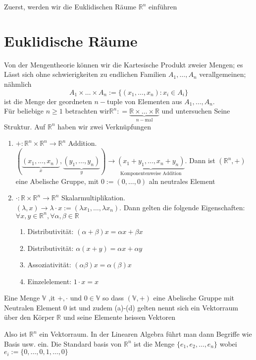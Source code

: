 \noindent Zuerst, werden wir die Euklidischen Räume $\mathbb{R}^n$ einführen
\section{Euklidische Räume}
Von der Mengentheorie können wir die Kartesische Produkt zweier Mengen; es Lässt sich ohne schwierigkeiten zu endlichen Familien $A_1,\dots ,A_n$ verallgemeinen; nähmlich \[A_1\times\dots\times A_n:=\{\left(x_1,\dots ,x_n\right):x_i\in A_i \}\] ist die Menge der geordneten $n-$tuple von Elementen aus $A_1,\dots ,A_n$.\\

Für beliebige $n\geq 1$ betrachten wir$ \mathbb{R}^n: = \underbrace {\mathbb{R} \times  \ldots  \times \mathbb{R} }_{n - {\text{mal}}}$ und untersuchen Seine Struktur. Auf $\mathbb{R}^n$ haben wir zwei Verknüpfungen
\begin{enumerate}
    \item $+:\mathbb{R}^n\times\mathbb{R}^n\to\mathbb{R}^n$ Addition.\\
$\left( {\underbrace {\left( {{x_1}, \ldots ,{x_n}} \right)}_x,\underbrace {\left( {{y_1}, \ldots ,{y_n}} \right)}_y} \right) \to \underbrace {\left( {{x_1} + {y_1}, \ldots ,{x_n} + {y_n}} \right)}_{{\text{Komponentenweise Addition}}}$. Dann ist $\left( \mathbb{R}^n,+\right)$ eine Abelische Gruppe, mit $0:=(0,\dots,0)$ aln neutrales Element
\item $\cdot:\mathbb{R}\times\mathbb{R}^n\to\mathbb{R}^n$ Skalarmultiplikation.\\
$(\lambda,x)\to\lambda\cdot x:=(\lambda x_1,\dots,\lambda x_n)$. Dann gelten die folgende Eigenschaften: $\forall x,y\in\mathbb{R}^n,\forall \alpha,\beta\in\mathbb{R}$ 
\begin{enumerate}
\item Distributivität: $\left( \alpha+\beta\right) x=\alpha x+\beta x$
\item Distributivität: $\alpha\left(x+y\right) = \alpha x+\alpha y$
\item Assoziativität: $\left( \alpha\beta\right) x=\alpha\left( \beta\right) x$
\item Einzelelement: $1\cdot x=x$
\end{enumerate}
\end{enumerate}
 
\begin{definition}{2.15}
Eine Menge $\mathbb{V}$ ,it $+,\cdot$ und $0\in\mathbb{V}$ so dass $\left(\mathbb{V},+\right)$ eine Abelische Gruppe mit Neutralen Element 0 ist und zudem (a)-(d) gelten nennt sich ein Vektorraum über den Körper $\mathbb{R}$ und seine Elemente heissen Vektoren
\end{definition}
Also ist $\mathbb{R}^n$ ein Vektorraum. In der Linearen Algebra führt man dann Begriffe wie Basis usw. ein. Die Standard basis von $\mathbb{R}^n$ ist die Menge $\{e_1,e_2,\dots,e_n \}$ wobei $e_i:=\{0,\dots,0,1,\dots,0\}$ \\

